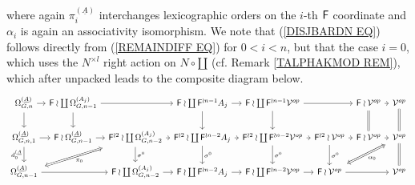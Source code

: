 \documentclass[a4paper,10pt]{article}%
\begin{document}
where again $\pi_i^{(\underline{A})}$ interchanges lexicographic orders on the $i$-th $\mathsf{F}$ coordinate and $\alpha_i$ is again an associativity isomorphism.
We note that (\ref{DISJBARDN EQ}) follows directly from 
(\ref{REMAINDIFF EQ}) for $0<i<n$, but that the case $i=0$, which uses the $N^{\times l}$ right action on $N \circ \amalg$ (cf. Remark \ref{TALPHAKMOD REM}), which after unpacked leads to the composite diagram below.
\begin{equation}\label{ASSOCSPANJ1 EQ}
  \begin{tikzcd}[column sep=0.5em]
    \Omega_{G,n}^{(\underline{A})}  \ar{d} \ar{r} &
    \Fin \wr \coprod \Omega_{G,n-1}^{(A_j)} \ar{d} \ar{rr} &&
    \Fin \wr \coprod \Fin^{\wr n-1} A_j \ar{d} \ar{r}&
    \Fin \wr \coprod \Fin^{\wr n-1} \mathcal{V}^{op} \ar{d}\ar{rr} & &
    |[alias=cat3]|
    \Fin \wr \mathcal{V}^{op} \ar[equal]{d} \ar{r} &
    \mathcal{V}^{op} \ar[equal]{d}
    \\
    \Omega_{G,n,1}^{(\underline{A})} \ar{r} \ar{d}[swap]{d_0^{(\underline{A}}} &
    |[alias=cat2]|
    \Fin \wr \Omega_{G,n-1}^{(\underline{A})} \ar{r} &
    |[alias=FFOmega]| \Fin^{\wr 2} \wr \coprod \Omega_{G,n-2}^{(A_j)} \ar{d}{\sigma^0} \ar{r} &
    \Fin^{\wr 2} \wr \coprod \Fin^{\wr n-2} A_j \ar{d}{\sigma^0} \ar{r} &
    \Fin^{\wr 2} \wr \coprod \Fin^{\wr n-2} \mathcal{V}^{op} \ar{d}{\sigma^0} \ar{r}&
    |[alias=dog3]|
    \Fin^{\wr 2} \wr \mathcal{V}^{op} \ar{d}{\sigma^0} \ar{r} &
    \Fin \wr \mathcal{V}^{op} \ar{r} &
    |[alias=dog]|
    \mathcal{V}^{op} \ar[equal]{d}
    \\
    |[alias=Omega]|\Omega_{G,n-1}^{(\underline{A})} \ar{rr} &&
    \Fin \wr \coprod \Omega_{G,n-2}^{(A_j)} \ar{r} &
    \Fin \wr \coprod \Fin^{\wr n-2} A_j \ar{r} &
    \Fin \wr \coprod \Fin^{\wr n-2} \mathcal{V}^{op} \ar{r}&
    |[alias=cat]|
    \Fin \wr \mathcal{V}^{op} \ar{rr} &&
    \mathcal{V}^{op}
    \arrow[Leftrightarrow, from=FFOmega, to=Omega,shorten <=0.15cm,shorten >=0.15cm,"\pi_0"]
    \arrow[Leftrightarrow, from=dog, to=cat,shorten <=0.15cm,shorten >=0.15cm,"\alpha_0"]
  \end{tikzcd}
\end{equation}
\end{document}
